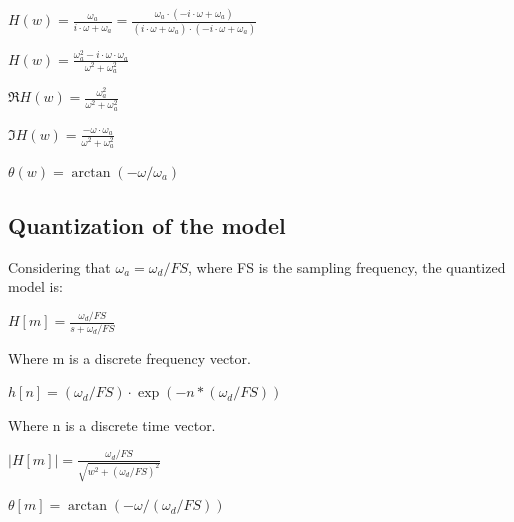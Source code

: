 \documentclass{article}
\begin{document}
\centerline{$ H(w) = \frac{\omega_{a}}{i\cdot \omega + \omega_{a}} = \frac{\omega_{a} \cdot (-i \cdot \omega + \omega_{a})}{(i \cdot \omega + \omega_{a}) \cdot (-i \cdot \omega + \omega_{a})}
	$}
\vspace{\baselineskip}

\centerline{$ H(w) = \frac{\omega_{a}^2 - i \cdot \omega \cdot \omega_{a}}{\omega^2 + \omega_{a}^2}
	$}
\vspace{\baselineskip}

\centerline{$ \Re{H(w)} = \frac{\omega_{a}^2}{\omega^2 + \omega_{a}^2}
	$}
\vspace{\baselineskip}

\centerline{$ \Im{H(w)} = \frac{-\omega \cdot \omega_{a}}{\omega^2 + \omega_{a}^2}
	$}
\vspace{\baselineskip}

\begin{question}
\centerline{$ \theta(w) = \arctan{(- \omega / \omega_{a})}
	$}
\end{question}

\subsection{Quantization of the model}

Considering that $\omega_{a} = \omega_{d} / FS$, where FS is the sampling frequency, the quantized model is:

\begin{question}
	\centerline{$ H[m] = \frac{\omega_{d} / FS}{s + \omega_{d} / FS}
		$}
\end{question}
Where m is a discrete frequency vector.

\begin{question}
	\centerline{$ h[n] = (\omega_{d} / FS) \cdot \exp(-n * (\omega_{d} / FS))
		$}
\end{question}
Where n is a discrete time vector.

\begin{question}
	\centerline{$ |H[m]| = \frac{\omega_{d} / FS}{\sqrt{w^2 + (\omega_{d} / FS)^2}}
		$}
\end{question}

\begin{question}
	\centerline{$ \theta[m] = \arctan{(- \omega /(\omega_{d} / FS))}
		$}
\end{question}
\end{document}
